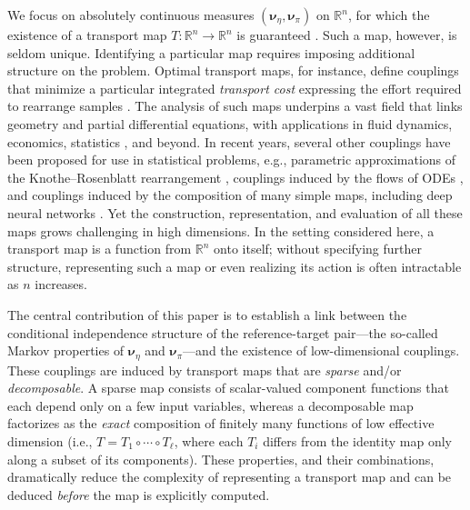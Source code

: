\documentclass[twoside,11pt]{article}
\newcommand{\genm}{\boldsymbol{\nu} }   %
\newcommand{\re}{\mathbb{R}}
\newcommand{\ra}{\rightarrow}
\begin{document}
We focus on absolutely continuous measures 
$(\genm_\eta, \genm_\pi)$ on $\re^n$,
for which the existence of %
a transport map $T:\re^n \ra \re^n$ is guaranteed 
\citep{santambrogio2015optimal}.
Such a map, however, is seldom unique.
%
 Identifying a particular 
 map
 requires imposing additional structure on the problem. Optimal transport maps, for instance, 
 define %
 couplings that 
 minimize a particular integrated \textit{transport cost} expressing the effort required to rearrange samples \citep{villani2008optimal}.
 The analysis of such maps underpins a vast field that links geometry
 and partial differential equations, with applications in fluid
 dynamics, economics, 
 statistics
 \citep{douglas1999applications,kantorovich1965best},
 and beyond. In recent years, several other couplings have been proposed for
 use in statistical problems, e.g., parametric approximations
  of the Knothe--Rosenblatt rearrangement \citep{el2012bayesian},
 couplings
 induced by the flows of ODEs %
 \citep{anderes2012general,heng2015gibbs}, and
 couplings induced by the composition of many simple maps, including deep
 neural networks %
 \citep{rezende2015variational,liu2016stein}.
%
Yet the construction, representation, and evaluation of all these 
maps
grows challenging in high dimensions. In the setting considered here, a 
transport map
is a function 
from $\mathbb{R}^n$ onto itself; without specifying further structure, representing
such a map or even realizing its action 
%
is often
intractable as $n$ increases. 

%
The central contribution of this paper is to establish a link between
the conditional independence structure of the reference-target pair---the
so-called Markov properties \citep{lauritzen1996graphical} of $\genm_\eta$ and
$\genm_\pi$---and the existence of low-dimensional couplings.
These couplings are induced by transport maps that are \textit{sparse}
and/or \textit{decomposable}.
%
%
A sparse map %
consists of 
scalar-valued component functions that each depend only on a few input variables, whereas
a decomposable map
%
%
factorizes as the
{\it exact} composition of finitely many functions of low effective dimension
%
%
%
%
(i.e., $T = T_1 \circ \cdots \circ T_\ell$, where each $T_i$ differs from the
identity map only along a subset of its components).
%
%
%
These properties, and their combinations, dramatically reduce the complexity of 
representing a transport map and can be deduced \textit{before} the
%
map 
is explicitly computed.
\end{document}
